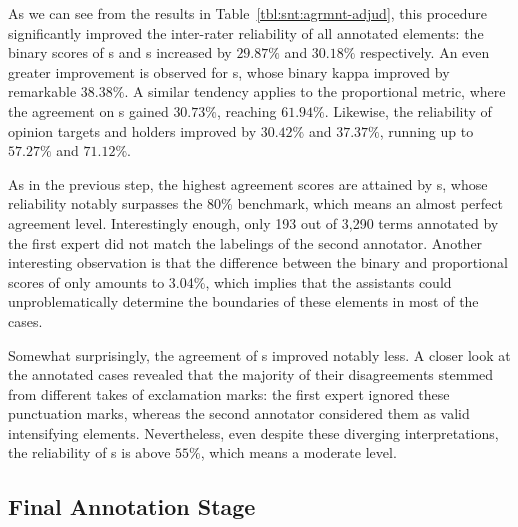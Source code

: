 As we can see from the results in Table~\ref{tbl:snt:agrmnt-adjud},
this procedure significantly improved the inter-rater reliability of
all annotated elements: the binary scores of s and
s increased by $29.87\%$ and $30.18\%$ respectively.
An even greater improvement is observed for s, whose
binary kappa improved by remarkable $38.38\%$.  A similar tendency
applies to the proportional metric, where the agreement on
s gained $30.73\%$, reaching $61.94\%$.  Likewise,
the reliability of opinion targets and holders improved by $30.42\%$
and $37.37\%$, running up to $57.27\%$ and $71.12\%$.



As in the previous step, the highest agreement scores are attained by
s, whose reliability notably surpasses the 80\%
benchmark, which means an almost perfect agreement level.
Interestingly enough, only 193 out of 3,290 terms annotated by the
first expert did not match the labelings of the second annotator.
Another interesting observation is that the difference between the
binary and proportional scores of  only amounts
to 3.04\%, which implies that the assistants could unproblematically
determine the boundaries of these elements in most of the cases.

Somewhat surprisingly, the agreement of s
improved notably less.  A closer look at the annotated cases revealed
that the majority of their disagreements stemmed from different takes
of exclamation marks: the first expert ignored these punctuation
marks, whereas the second annotator considered them as valid
intensifying elements.  Nevertheless, even despite these diverging
interpretations, the reliability of s is above
$55\%$, which means a moderate level.

\subsection{Final Annotation Stage}\label{subsec:eval-final-annotation}

